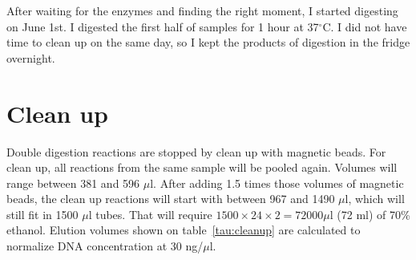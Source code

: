 \documentclass[a4paper,12pt,twosided]{article}
\begin{document}
After waiting for the enzymes and finding the right moment, I started digesting on June 1st. I digested the first half of samples for 1 hour at 37$^{\circ}\mathrm{C}$. I did not have time to clean up on the same day, so I kept the products of digestion in the fridge overnight.

\section{Clean up}
Double digestion reactions are stopped by clean up with magnetic beads. For clean up, all reactions from the same sample will be pooled again. Volumes will range between 381 and 596 $\mu$l. After adding 1.5 times those volumes of magnetic beads, the clean up reactions will start with between 967 and 1490 $\mu$l, which will still fit in 1500 $\mu$l tubes. That will require $1500 \times 24 \times 2 = 72000\mu$l (72 ml) of 70\% ethanol. Elution volumes shown on table~\ref{tau:cleanup} are calculated to normalize DNA concentration at 30 ng/$\mu$l.
\end{document}
